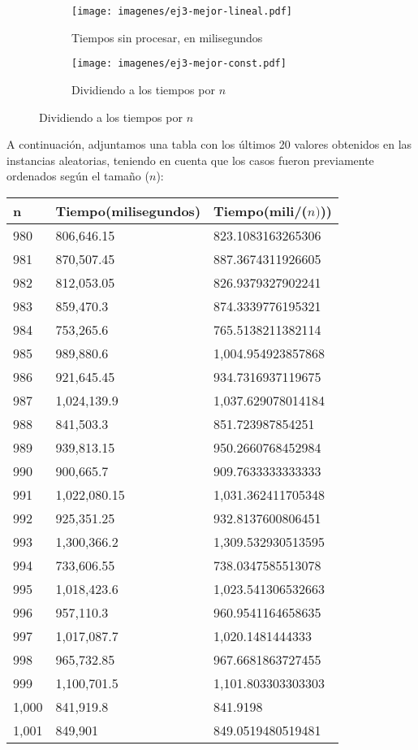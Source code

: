 \begin{figure}[H]
        \centering
\begin{subfigure}[b]{0.5\textwidth}
                \texttt{[image: imagenes/ej3-mejor-lineal.pdf]}
                \caption{Tiempos sin procesar, en milisegundos}
        \end{subfigure}%

        \begin{subfigure}[b]{0.5\textwidth}
                \texttt{[image: imagenes/ej3-mejor-const.pdf]}
                \caption{Dividiendo a los tiempos por $n$}
        \end{subfigure}

\end{figure}

A continuación, adjuntamos una tabla con los últimos 20 valores obtenidos en las instancias aleatorias, teniendo en cuenta que los casos fueron previamente ordenados según el tamaño ($n$):

\begin{table}[H]
\parbox{0.3\textwidth}{
    \begin{tabular}{ | l | l | l |}
    \hline
n   &Tiempo(milisegundos) &Tiempo(mili/($n)$))\\ \hline
980	&806,646.15	&823.1083163265306\\ \hline
981	&870,507.45	&887.3674311926605\\ \hline
982	&812,053.05	&826.9379327902241\\ \hline
983	&859,470.3	&874.3339776195321\\ \hline
984	&753,265.6	&765.5138211382114\\ \hline
985	&989,880.6	&1,004.954923857868\\ \hline
986	&921,645.45	&934.7316937119675\\ \hline
987	&1,024,139.9	&1,037.629078014184\\ \hline
988	&841,503.3	&851.723987854251\\ \hline
989	&939,813.15	&950.2660768452984\\ \hline
990	&900,665.7	&909.7633333333333\\ \hline
991	&1,022,080.15	&1,031.362411705348\\ \hline
992	&925,351.25	&932.8137600806451\\ \hline
993	&1,300,366.2	&1,309.532930513595\\ \hline
994	&733,606.55	&738.0347585513078\\ \hline
995	&1,018,423.6	&1,023.541306532663\\ \hline
996	&957,110.3	&960.9541164658635\\ \hline
997	&1,017,087.7	&1,020.1481444333\\ \hline
998	&965,732.85	&967.6681863727455\\ \hline
999	&1,100,701.5	&1,101.803303303303\\ \hline
1,000	&841,919.8	&841.9198\\ \hline
1,001	&849,901	&849.0519480519481\\ \hline
\end{tabular}
}
\end{table}

